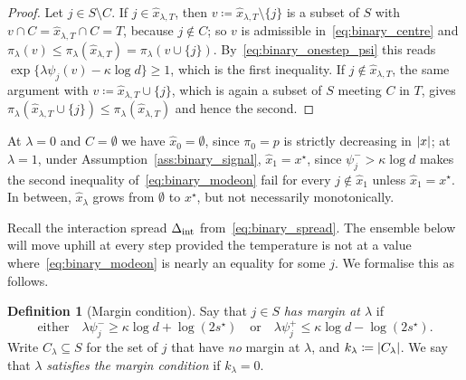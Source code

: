 \documentclass[aos]{imsart}%
\DeclarePairedDelimiter{\abs}{\lvert}{\rvert}
\theoremstyle{plain}
\theoremstyle{definition}
\newtheorem{definition}[theorem]{Definition}
\begin{document}
    \begin{proof}
        Let $j\in S\setminus C$. If $j\in\hat x_{\lambda,T}$, then
        $v\coloneq\hat x_{\lambda,T}\setminus\{j\}$ is a subset of $S$ with
        $v\cap C=\hat x_{\lambda,T}\cap C=T$, because $j\notin C$; so $v$ is
        admissible in~\eqref{eq:binary_centre} and
        $\pi_\lambda(v)\leq\pi_\lambda(\hat x_{\lambda,T})=
        \pi_\lambda(v\cup\{j\})$. By~\eqref{eq:binary_onestep_psi} this reads
        $\exp\{\lambda\psi_j(v)-\kappa\log d\}\geq1$, which is the first
        inequality. If $j\notin\hat x_{\lambda,T}$, the same argument with
        $v\coloneq\hat x_{\lambda,T}\cup\{j\}$, which is again a subset of $S$
        meeting $C$ in $T$, gives
        $\pi_\lambda(\hat x_{\lambda,T}\cup\{j\})\leq
        \pi_\lambda(\hat x_{\lambda,T})$ and hence the second.
    \end{proof}

    At $\lambda=0$ and $C=\emptyset$ we have $\hat x_0=\emptyset$, since
    $\pi_0=p$ is strictly decreasing in $\abs x$; at $\lambda=1$, under
    Assumption~\ref{ass:binary_signal}, $\hat x_1=x^{\star}$, since
    $\psi_j^{-}>\kappa\log d$ makes the second inequality
    of~\eqref{eq:binary_modeon} fail for every $j\notin\hat x_1$ unless
    $\hat x_1=x^{\star}$. In between, $\hat x_\lambda$ grows from $\emptyset$
    to $x^{\star}$, but not necessarily monotonically.

    Recall the interaction spread $\Delta_{\mathrm{int}}$ from~\eqref{eq:binary_spread}. The
    ensemble below will move uphill at every step provided the temperature is
    not at a value where~\eqref{eq:binary_modeon} is nearly an equality for
    some $j$. We formalise this as follows.

    \begin{definition}[Margin condition]
        \label{def:binary_margin}
        Say that $j\in S$ \emph{has margin at $\lambda$} if
        \begin{equation}
            \label{eq:binary_margin}
            \text{either}\quad
            \lambda\psi_j^{-}\geq\kappa\log d+\log(2s^{\star})
            \quad\text{or}\quad
            \lambda\psi_j^{+}\leq\kappa\log d-\log(2s^{\star}).
            \tag{$M_\lambda$}
        \end{equation}
        Write $C_\lambda\subseteq S$ for the set of $j$ that have \emph{no}
        margin at $\lambda$, and $k_\lambda\coloneq\abs{C_\lambda}$. We say
        that $\lambda$ \emph{satisfies the margin condition} if
        $k_\lambda=0$.
    \end{definition}
\end{document}
